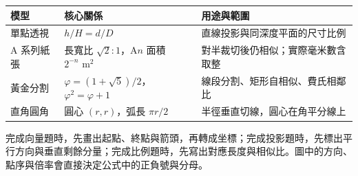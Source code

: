 \documentclass[11pt,a4paper]{article}
\newcounter{none}
\begin{document}
{\def\LTcaptype{none} %
\begin{longtable}[]{@{}
  >{\raggedright\arraybackslash}p{}
  >{\raggedright\arraybackslash}p{}
  >{\raggedright\arraybackslash}p{}@{}}
\toprule\noalign{}
\begin{minipage}[b]{\linewidth}\raggedright
模型
\end{minipage} & \begin{minipage}[b]{\linewidth}\raggedright
核心關係
\end{minipage} & \begin{minipage}[b]{\linewidth}\raggedright
用途與範圍
\end{minipage} \\
\midrule\noalign{}
\endhead
\bottomrule\noalign{}
\endlastfoot
單點透視 & \(h/H=d/D\) & 直線投影與同深度平面的尺寸比例 \\
A 系列紙張 & 長寬比 \(\sqrt2:1\)，A\(n\) 面積 \(2^{-n}\text{ m}^2\) & 對半裁切後仍相似；實際毫米數含取整 \\
黃金分割 & \(\varphi=(1+\sqrt5)/2\)，\(\varphi^2=\varphi+1\) & 線段分割、矩形自相似、費氏相鄰比 \\
直角圓角 & 圓心 \((r,r)\)，弧長 \(\pi r/2\) & 半徑垂直切線，圓心在角平分線上 \\
\end{longtable}
}

完成向量題時，先畫出起點、終點與箭頭，再轉成坐標；完成投影題時，先標出平行方向與垂直剩餘分量；完成比例題時，先寫出對應長度與相似比。圖中的方向、點序與倍率會直接決定公式中的正負號與分母。
\end{document}
